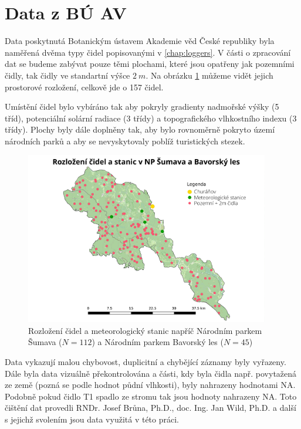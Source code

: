 \section{Data z BÚ AV}
Data poskytnutá Botanickým ústavem Akademie věd České republiky byla naměřená dvěma typy čidel popisovanými v \ref{chap:loggers}. V části o zpracování dat se budeme zabývat pouze těmi plochami, které jsou opatřeny jak pozemními čidly, tak čidly ve standartní výšce $\SI{2}{m}$. Na obrázku \ref{fig:rozlozenicidel} můžeme vidět jejich prostorové rozložení, celkově jde o 157 čidel. 

Umístění čidel bylo vybíráno tak aby pokryly gradienty nadmořské výšky (5 tříd), potenciální solární radiace (3 třídy) a topografického vlhkostního indexu (3 třídy). Plochy byly dále doplněny tak, aby bylo rovnoměrně pokryto území národních parků a aby se nevyskytovaly poblíž turistických stezek.

\begin{figure}
	\centering
	\includegraphics[width=0.95\textwidth]{img/rozlozenicidel.pdf}
	\caption{Rozložení čidel a meteorologický stanic napříč Národním parkem Šumava ($N=112$) a Národním parkem Bavorský les ($N=45$)}
	\label{fig:rozlozenicidel}
\end{figure}

Data vykazují malou chybovost, duplicitní a chybějící záznamy byly vyřazeny. Dále byla data vizuálně překontrolována a části, kdy byla čidla např. povytažená ze země (pozná se podle hodnot půdní vlhkosti), byly nahrazeny hodnotami NA. Podobně pokud čidlo T1 spadlo ze stromu tak jsou hodnoty nahrazeny NA. Toto čištění dat provedli RNDr. Josef Brůna, Ph.D., doc. Ing. Jan Wild, Ph.D. a další s jejichž svolením jsou data využitá v této práci.

